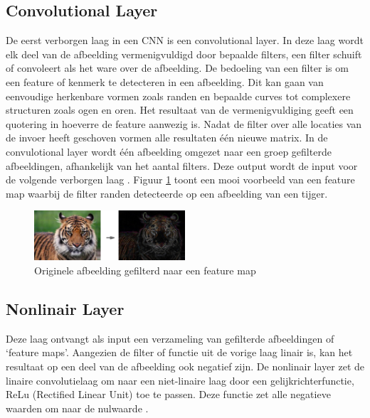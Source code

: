 \subsection{Convolutional Layer}
\label{ssec:Convolutional Layer}
De eerst verborgen laag in een CNN is een convolutional layer. In deze laag wordt elk deel van de afbeelding vermenigvuldigd door bepaalde filters, een filter schuift of convoleert als het ware over de afbeelding. De bedoeling van een filter is om een feature of kenmerk te detecteren in een afbeelding. Dit kan gaan van eenvoudige herkenbare vormen zoals randen en bepaalde curves tot complexere structuren zoals ogen en oren. Het resultaat van de vermenigvuldiging geeft een quotering in hoeverre de feature aanwezig is. Nadat de filter over alle locaties van de invoer heeft geschoven vormen alle resultaten één nieuwe matrix. In de convulotional layer wordt één afbeelding omgezet naar een groep gefilterde afbeeldingen, afhankelijk van het aantal filters. Deze output wordt de input voor de volgende verborgen laag \autocite{becominghuman}.
Figuur \ref{fig:featuremap} toont een mooi voorbeeld van een feature map waarbij de filter randen detecteerde op een afbeelding van een tijger.
\begin{figure}[h!]
    \centering
        \includegraphics[width=0.5\textwidth]{img/tiger_edge_detection.png}
    \caption{Originele afbeelding gefilterd naar een feature map \autocite{tejani}}
    \label{fig:featuremap}
  \end{figure}

\subsection{Nonlinair Layer}
\label{ssec:Nonlinair Layer}
Deze laag ontvangt als input een verzameling van gefilterde afbeeldingen of ‘feature maps’. Aangezien de filter of functie uit de vorige laag linair is, kan het resultaat op een deel van de afbeelding ook negatief zijn. De nonlinair layer zet de linaire convolutielaag om naar een niet-linaire laag door een gelijkrichterfunctie, ReLu (Rectified Linear Unit) toe te passen. Deze functie zet alle negatieve waarden om naar de nulwaarde \autocite{cadence}.

